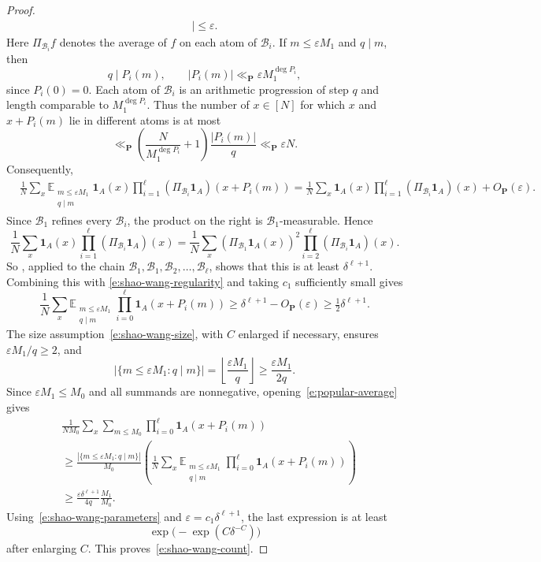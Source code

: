 \documentclass{amsart}
\newcommand{\E}{\mathbb E}
\newcommand{\1}{\mathbf 1}
\begin{document}
\begin{proof}
\begin{align}
 \bigg|\leq\varepsilon.
\end{align}
Here $\Pi_{\mathcal B_i}f$ denotes the average of $f$ on each atom of
$\mathcal B_i$.
If $m\leq\varepsilon M_1$ and $q\mid m$, then
\[
 q\mid P_i(m),\qquad
 |P_i(m)|\ll_{\mathbf P}\varepsilon M_1^{\deg P_i},
\]
since $P_i(0)=0$.  Each atom of $\mathcal B_i$ is an arithmetic
progression of step $q$ and length comparable to
$M_1^{\deg P_i}$.  Thus the number of $x\in[N]$ for which $x$ and
$x+P_i(m)$ lie in different atoms is at most
\[
 \ll_{\mathbf P}
 \left(\frac{N}{M_1^{\deg P_i}}+1\right)
 \frac{|P_i(m)|}{q}
 \ll_{\mathbf P}\varepsilon N.
\]
Consequently,
\begin{align*}
 &\frac1N\sum_x
 \E_{\substack{m\leq\varepsilon M_1\\q\mid m}}
 \1_A(x)\prod_{i=1}^{\ell}
 (\Pi_{\mathcal B_i}\1_A)(x+P_i(m))=
 \frac1N\sum_x\1_A(x)\prod_{i=1}^{\ell}
 (\Pi_{\mathcal B_i}\1_A)(x)+O_{\mathbf P}(\varepsilon).
\end{align*}
Since $\mathcal B_1$ refines every $\mathcal B_i$, the product on the
right is $\mathcal B_1$-measurable.  Hence
\[
 \frac1N\sum_x\1_A(x)\prod_{i=1}^{\ell}
 (\Pi_{\mathcal B_i}\1_A)(x)
 =
 \frac1N\sum_x(\Pi_{\mathcal B_1}\1_A(x))^2
 \prod_{i=2}^{\ell}(\Pi_{\mathcal B_i}\1_A)(x).
\]
So \cite[Lemma~5.2]{ShaoWang}, applied to the chain
$\mathcal B_1,\mathcal B_1,\mathcal B_2,\ldots,\mathcal B_\ell$,
shows that this is at least $\delta^{\ell+1}$.  Combining this with
\eqref{e:shao-wang-regularity} and taking $c_1$ sufficiently small
gives
\begin{equation}\label{e:popular-average}
 \frac1N\sum_x
 \E_{\substack{m\leq\varepsilon M_1\\q\mid m}}
 \prod_{i=0}^{\ell}\1_A(x+P_i(m))
 \geq\delta^{\ell+1}-O_{\mathbf P}(\varepsilon)
 \geq\tfrac12\delta^{\ell+1}.
\end{equation}
The size assumption~\eqref{e:shao-wang-size}, with $C$ enlarged if
necessary, ensures $\varepsilon M_1/q\geq2$, and 
\[
 |\{m\leq\varepsilon M_1:q\mid m\}|
 =\left\lfloor\frac{\varepsilon M_1}{q}\right\rfloor
 \geq\frac{\varepsilon M_1}{2q}.
\]
Since $\varepsilon M_1\leq M_0$ and all summands are nonnegative,
opening~\eqref{e:popular-average} gives
\begin{align*}
 &\frac1{NM_0}\sum_x\sum_{m\leq M_0}
 \prod_{i=0}^{\ell}\1_A(x+P_i(m))\\
 &\geq
 \frac{|\{m\leq\varepsilon M_1:q\mid m\}|}{M_0}
 \left(
 \frac1N\sum_x
 \E_{\substack{m\leq\varepsilon M_1\\q\mid m}}
 \prod_{i=0}^{\ell}\1_A(x+P_i(m))
 \right)\\
 &\geq
 \frac{\varepsilon\delta^{\ell+1}}{4q}\frac{M_1}{M_0}.
\end{align*}
Using~\eqref{e:shao-wang-parameters} and
$\varepsilon=c_1\delta^{\ell+1}$, the last expression is at least
\[
 \exp\!\bigl(-\exp(C\delta^{-C})\bigr)
\]
after enlarging $C$.  This proves~\eqref{e:shao-wang-count}.
\end{proof}
\end{document}
